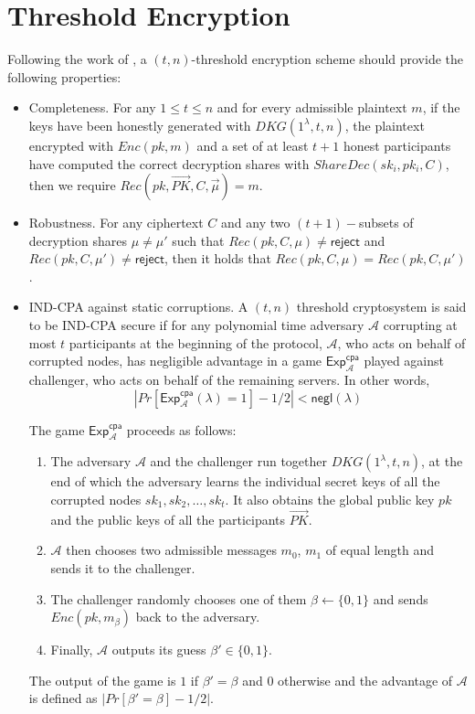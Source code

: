 \documentclass[letterpaper,twocolumn,10pt]{article}
\theoremstyle{definition}
\theoremstyle{remark}
\begin{document}
\section{Threshold Encryption}
\label{appendix:thresholdEnc}
Following the work of \cite{cortier2013distributed}, a $(t, n)$-threshold encryption scheme should provide the following properties:
\begin{itemize}
    \item Completeness. For any $1\le t\le n$ and for every admissible plaintext $m$, if the keys have been honestly generated with $DKG(1^\lambda, t, n)$, the plaintext encrypted with $Enc(pk, m)$ and a set of at least $t+1$ honest participants have computed the correct decryption shares with $ShareDec(sk_i, pk_i, C)$, then we require $Rec(pk, \vec{PK}, C, \vec{\mu} ) = m$.
    \item Robustness. For any ciphertext $C$ and any two $(t+1)-$subsets of decryption shares $\mu \ne \mu'$ such that $Rec(pk, C, \mu) \ne \mathsf{reject}$ and $Rec(pk, C, \mu') \ne \mathsf{reject}$, then it holds that $Rec(pk, C, \mu) = Rec(pk, C, \mu')$.
    \item IND-CPA against static corruptions. A $(t, n)$ threshold cryptosystem is said to be IND-CPA secure if for any polynomial time adversary $\mathcal{A}$ corrupting at most $t$ participants at the beginning of the protocol, $\mathcal{A}$, who acts on behalf of corrupted nodes, has negligible advantage in a  game $\mathsf{Exp}^{\mathsf{cpa}}_{\mathcal{A}}$ played against challenger, who acts on behalf of the remaining servers. In other words,
    $$|Pr[\mathsf{Exp}_{\mathcal{A}}^{\mathsf{cpa}}(\lambda) = 1] - 1/2| < \mathsf{negl}(\lambda)$$
    
    The game $\mathsf{Exp}^{\mathsf{cpa}}_{\mathcal{A}}$ proceeds as follows:
    \begin{enumerate}
        \item The adversary $\mathcal{A}$ and the challenger run together $DKG(1^\lambda, t, n)$, at the end of which the adversary learns the individual secret keys of all the corrupted nodes $sk_1, sk_2, \ldots, sk_t$. It also obtains the global public key $pk$ and the public keys of all the participants $\vec{PK}$.
        \item $\mathcal{A}$ then chooses two admissible messages $m_0$, $m_1$ of equal length and sends it to the challenger.
        \item The challenger randomly chooses one of them $\beta \leftarrow \{0, 1\}$ and sends $Enc(pk, m_{\beta})$ back to the adversary.
        \item Finally, $\mathcal{A}$ outputs its guess $\beta' \in \{0,1\}$.
    \end{enumerate}
    The output of the game is $1$ if $\beta' = \beta$ and $0$ otherwise and the advantage of $\mathcal{A}$ is defined as $|Pr[\beta' = \beta] - 1/2|$.
\end{itemize}
\end{document}
